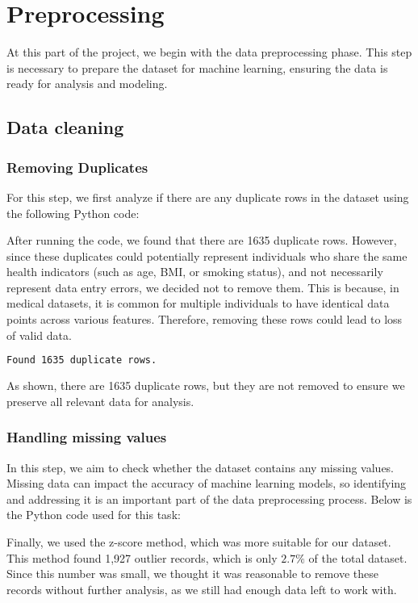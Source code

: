 \section{Preprocessing}

At this part of the project, we begin with the data preprocessing phase. This step is necessary to prepare the dataset for machine learning, ensuring the data is ready for analysis and modeling.

\subsection{Data cleaning}
\subsubsection{Removing Duplicates}
For this step, we first analyze if there are any duplicate rows in the dataset using the following Python code:




After running the code, we found that there are 1635 duplicate rows. However, since these duplicates could potentially represent individuals who share the same health indicators (such as age, BMI, or smoking status), and not necessarily represent data entry errors, we decided not to remove them. This is because, in medical datasets, it is common for multiple individuals to have identical data points across various features. Therefore, removing these rows could lead to loss of valid data.

\begin{lstlisting}[language=bash]
Found 1635 duplicate rows.
\end{lstlisting}

As shown, there are 1635 duplicate rows, but they are not removed to ensure we preserve all relevant data for analysis.

\subsubsection{Handling missing values}

In this step, we aim to check whether the dataset contains any missing values. Missing data can impact the accuracy of machine learning models, so identifying and addressing it is an important part of the data preprocessing process. Below is the Python code used for this task:

\noindent Finally, we used the z-score method, which was more suitable for our dataset. This method found 1,927 outlier records, which is only $2.7\%$ of the total dataset. Since this number was small, we thought it was reasonable to remove these records without further analysis, as we still had enough data left to work with.

